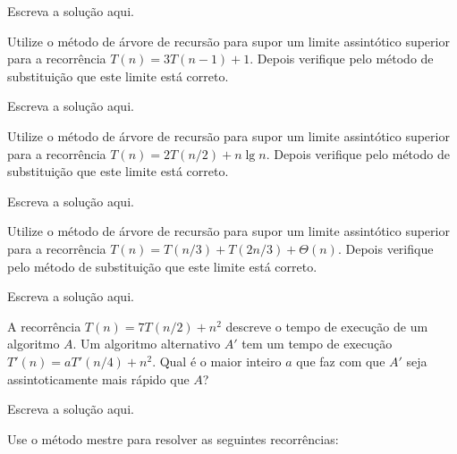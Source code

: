 \documentclass[a4paper]{exam}
\begin{document}
\begin{questions}
  \begin{solution}
    Escreva a solução aqui.
  \end{solution}
  \question Utilize o método de árvore de recursão para supor um
  limite assintótico superior para a recorrência \linebreak
  $T(n) = 3T(n-1) + 1$. Depois verifique pelo método de
  substituição que este limite está correto.
  \begin{solution}
    Escreva a solução aqui.
  \end{solution}
  \question Utilize o método de árvore de recursão para supor um
  limite assintótico superior para a recorrência \linebreak
  $T(n) = 2T(n/2) + n \lg n$. Depois verifique pelo método de
  substituição que este limite está correto. 
  \begin{solution}
    Escreva a solução aqui.
  \end{solution}
  \question Utilize o método de árvore de recursão para supor um
  limite assintótico superior para a recorrência \linebreak $T(n) = T(n/3) +
  T(2n/3) + \Theta(n)$. Depois verifique pelo método de
  substituição que este limite está correto.
  \begin{solution}
    Escreva a solução aqui.
  \end{solution}
  \question A recorrência $T(n) = 7T(n/2) + n^2$ descreve o
  tempo de execução de um algoritmo $A$. Um algoritmo alternativo $A'$ 
  tem um tempo de execução $T'(n) = aT'(n/4) + n^2$. Qual é o maior
  inteiro $a$ que faz com que $A'$ seja assintoticamente mais rápido
  que $A$?
  \begin{solution}
    Escreva a solução aqui.
  \end{solution}
  \question Use o método mestre para resolver as seguintes
  recorrências: 
\end{questions}
\end{document}
